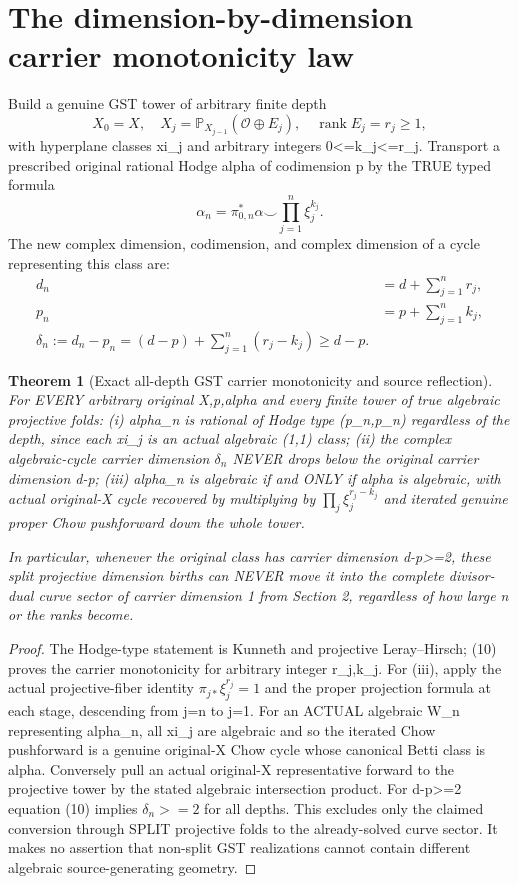 \documentclass[11pt]{article}
\newtheorem{theorem}{Theorem}[section]
\begin{document}
\section{The dimension-by-dimension carrier monotonicity law}
Build a genuine GST tower of arbitrary finite depth
\[
 X_0=X,\quad X_j=\mathbb P_{X_{j-1}}
                  (\mathcal O\oplus E_j),\quad
    \operatorname{rank}E_j=r_j\ge1,
\]
with hyperplane classes xi_j and arbitrary
integers 0<=k_j<=r_j.
Transport a prescribed original rational Hodge
alpha of codimension p by the TRUE typed formula
\[
 \alpha_n=\pi_{0,n}^*\alpha
                       \smile\prod_{j=1}^n\xi_j^{k_j}.
\]
The new complex dimension, codimension, and
complex dimension of a cycle representing this
class are:
\[
 \begin{aligned}
 d_n&=d+\sum_{j=1}^n r_j,\\
 p_n&=p+\sum_{j=1}^n k_j,\\
 \boxed{\delta_n:=d_n-p_n
           =(d-p)+\sum_{j=1}^n(r_j-k_j)\ge d-p.}
 \end{aligned}                                         \tag{10}
\]

\begin{theorem}[Exact all-depth GST carrier monotonicity and source reflection]
For EVERY arbitrary original X,p,alpha and every
finite tower of true algebraic projective folds:
(i) alpha_n is rational of Hodge type (p_n,p_n)
regardless of the depth, since each xi_j is
an actual algebraic (1,1) class;
(ii) the complex algebraic-cycle carrier
dimension $\delta_n$ NEVER drops below the
original carrier dimension d-p;
(iii) alpha_n is algebraic if and ONLY if
alpha is algebraic, with actual original-X
cycle recovered by multiplying by
$\prod_j\xi_j^{r_j-k_j}$ and iterated genuine
proper Chow pushforward down the whole tower.

In particular, whenever the original class
has carrier dimension d-p>=2,
these split projective dimension births
can NEVER move it into the complete
divisor-dual curve sector of carrier
dimension 1 from Section 2,
regardless of how large n or the
ranks become.
\end{theorem}
\begin{proof}
The Hodge-type statement is Kunneth and
projective Leray--Hirsch; (10) proves the
carrier monotonicity for arbitrary integer
r_j,k_j. For (iii), apply the actual
projective-fiber identity
$\pi_{j*}\xi_j^{r_j}=1$
and the proper projection formula at
each stage, descending from j=n to j=1.
For an ACTUAL algebraic W_n representing
alpha_n, all xi_j are algebraic and so
the iterated Chow pushforward is a genuine
original-X Chow cycle whose canonical
Betti class is alpha. Conversely
pull an actual original-X representative
forward to the projective tower by
the stated algebraic intersection product.
For d-p>=2 equation (10) implies
$\delta_n>=2$ for all depths.
This excludes only the claimed conversion
through SPLIT projective folds to the
already-solved curve sector. It makes
no assertion that non-split GST
realizations cannot contain different
algebraic source-generating geometry.
\end{proof}
\end{document}
